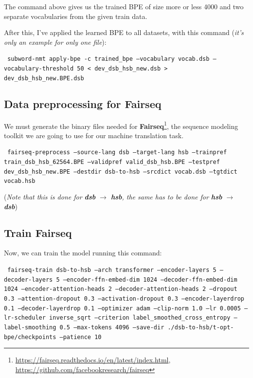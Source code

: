 \documentclass[12pt]{article}
\begin{document}
The command above gives us the trained BPE of size more or less 4000 and two separate vocabularies from the given train data.

After this, I've applied the learned BPE to all datasets, with this command (\textit{it's only an example for only one file}):

\vspace{0.5cm}
\texttt{
  subword-nmt apply-bpe -c trained\_bpe --vocabulary vocab.dsb --vocabulary-threshold 50 < dev\_dsb\_hsb\_new.dsb > dev\_dsb\_hsb\_new.BPE.dsb
}

\subsection{Data preprocessing for Fairseq}
We must generate the binary files needed for \textbf{Fairseq}\footnote{\href{https://fairseq.readthedocs.io/en/latest/index.html}{https://fairseq.readthedocs.io/en/latest/index.html}, \href{https://github.com/facebookresearch/fairseq}{https://github.com/facebookresearch/fairseq}}, the sequence modeling toolkit we are going to use for our machine translation task.

\vspace{0.5cm}
\texttt{
    fairseq-preprocess --source-lang dsb --target-lang hsb --trainpref train\_dsb\_hsb\_62564.BPE --validpref valid\_dsb\_hsb.BPE --testpref dev\_dsb\_hsb\_new.BPE --destdir dsb-to-hsb --srcdict vocab.dsb --tgtdict vocab.hsb
}

\vspace{0.2cm}
{\centering
(\textit{Note that this is done for \textbf{dsb} $\rightarrow$ \textbf{hsb}, the same has to be done for \textbf{hsb} $\rightarrow$ \textbf{dsb}})\par
}

\subsection{Train Fairseq}
Now, we can train the model running this command:

\vspace{0.2cm}
\texttt{
fairseq-train dsb-to-hsb --arch transformer --encoder-layers 5 --decoder-layers 5 --encoder-ffn-embed-dim 1024 --decoder-ffn-embed-dim 1024 --encoder-attention-heads 2 --decoder-attention-heads 2 --dropout 0.3 --attention-dropout 0.3 --activation-dropout 0.3 --encoder-layerdrop 0.1 --decoder-layerdrop 0.1 --optimizer adam --clip-norm 1.0 --lr 0.0005 --lr-scheduler inverse\_sqrt --criterion label\_smoothed\_cross\_entropy --label-smoothing 0.5 --max-tokens 4096 --save-dir ./dsb-to-hsb/t-opt-bpe/checkpoints --patience 10}
\end{document}
